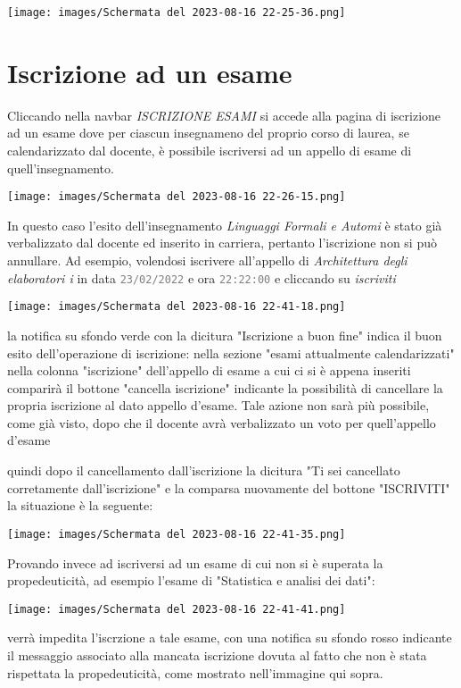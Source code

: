 \documentclass{article}
\newcommand{\attr}[1]{\texttt{\textcolor{gray}{#1}}}
\begin{document}
    \texttt{[image: images/Schermata del 2023-08-16 22-25-36.png]}

    \section{Iscrizione ad un esame}
    Cliccando nella navbar \textit{ISCRIZIONE ESAMI} si accede alla pagina di iscrizione ad un esame dove per ciascun insegnameno del proprio corso di laurea, se calendarizzato dal docente, è possibile iscriversi ad un appello di esame di quell'insegnamento.

    \texttt{[image: images/Schermata del 2023-08-16 22-26-15.png]}

    In questo caso l'esito dell'insegnamento \textit{Linguaggi Formali e Automi} è stato già verbalizzato dal docente ed inserito in carriera, pertanto l'iscrizione non si può annullare.
    Ad esempio, volendosi iscrivere all'appello di \textit{Architettura degli elaboratori i} in data \attr{23/02/2022} e ora \attr{22:22:00} e cliccando su \textit{iscriviti}

    \texttt{[image: images/Schermata del 2023-08-16 22-41-18.png]}

    la notifica su sfondo verde con la dicitura "Iscrizione a buon fine" indica il buon esito dell'operazione di iscrizione: nella sezione "esami attualmente calendarizzati" nella colonna "iscrizione" dell'appello di esame a cui ci si è appena inseriti comparirà il bottone "cancella iscrizione" indicante la possibilità di cancellare la propria iscrizione al dato appello d'esame. Tale azione non sarà più possibile, come già visto, dopo che il docente avrà verbalizzato un voto per quell'appello d'esame

    quindi dopo il cancellamento dall'iscrizione la dicitura "Ti sei cancellato corretamente dall'iscrizione" e la comparsa nuovamente del bottone "ISCRIVITI" la situazione è la seguente:

    \texttt{[image: images/Schermata del 2023-08-16 22-41-35.png]}

    Provando invece ad iscriversi ad un esame di cui non si è superata la propedeuticità, ad esempio l'esame di "Statistica e analisi dei dati":

    \texttt{[image: images/Schermata del 2023-08-16 22-41-41.png]}

    verrà impedita l'iscrzione a tale esame, con una notifica su sfondo rosso indicante il messaggio associato alla mancata iscrizione dovuta al fatto che non è stata rispettata la propedeuticità, come mostrato nell'immagine qui sopra.
\end{document}
